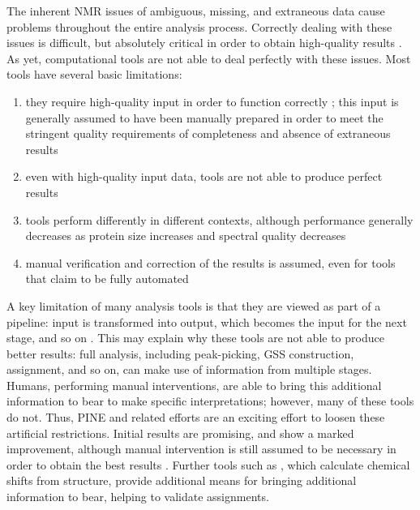 The inherent NMR issues of ambiguous, missing, and extraneous data cause 
problems throughout the entire analysis process.  Correctly dealing with 
these issues is difficult, but absolutely critical in order to obtain 
high-quality results \cite{williamson2009automated, guntert2009automated, 
altieri2004automation, baran2004automated}.  As yet, computational tools 
are not able to deal perfectly with these issues.  
Most tools have several basic limitations: 
\begin{enumerate}
  \item they require high-quality input in order to function correctly 
  \cite{saga, abacus_assignment, mars, autoassign2001, ezassign, pine, cyana2004}; 
  this input is generally assumed to have been manually prepared in order 
  to meet the stringent quality requirements of completeness and absence of 
  extraneous results
  \item even with high-quality input data, tools are not able to produce 
  perfect results 
  \item tools perform differently in different contexts, although 
  performance generally decreases as protein size increases and spectral quality 
  decreases
  \item manual verification and correction of the results is assumed, 
  even for tools that claim to be fully automated 
  \cite{williamson2009automated, guntert2009automated, altieri2004automation,
  baran2004automated}
\end{enumerate}

A key limitation of many analysis tools is that they are viewed as part of a 
pipeline: input is transformed into output, which becomes the input for the 
next stage, and so on \cite{pine}.  This may explain why these tools 
are not able to produce better results:  full analysis, including peak-picking, 
GSS construction, assignment, and so on, can make use of information from 
multiple stages.  Humans, performing manual interventions, are able to bring 
this additional information to bear to make specific interpretations; however, 
many of these tools do not.  Thus, PINE and related efforts  
are an exciting effort to loosen these artificial restrictions.  Initial 
results are promising, and show a marked improvement, although manual 
intervention is still assumed to be necessary in order to obtain the best 
results \cite{pine}.  Further tools such as \cite{shiftx2, cheshire}, 
which calculate chemical shifts from structure, provide additional means 
for bringing additional information to bear, helping to validate assignments.

